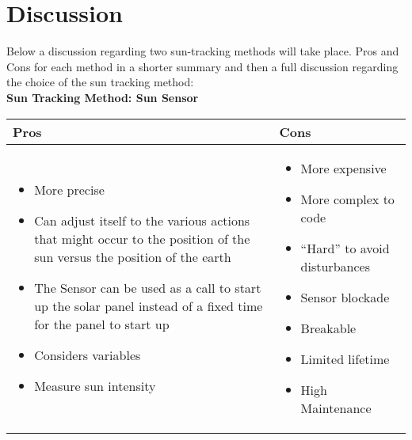 \chapter{Discussion}
Below a discussion regarding two sun-tracking methods will take place. Pros and Cons for each method in a shorter summary and then a full discussion regarding the choice of the sun tracking method:\\


\textbf{Sun Tracking Method: Sun Sensor}\\

\begin{tabular}{|p{7cm}|p{7cm}|}
\hline Pros & Cons\\ 

\hline 
\begin{itemize}
\item More precise
\item Can adjust itself to the various actions that might occur to the position of the sun versus the position of the earth
\item The Sensor can be used as a call to start up the solar panel instead of a fixed time for the panel to start up
\item Considers variables
\item Measure sun intensity
\end{itemize}

& 
\begin{itemize}
\item More expensive
\item More complex to code
\item “Hard” to avoid disturbances
\item Sensor blockade
\item Breakable
\item Limited lifetime
\item High Maintenance 
\end{itemize}
  \\ 

\hline 

\end{tabular} 

